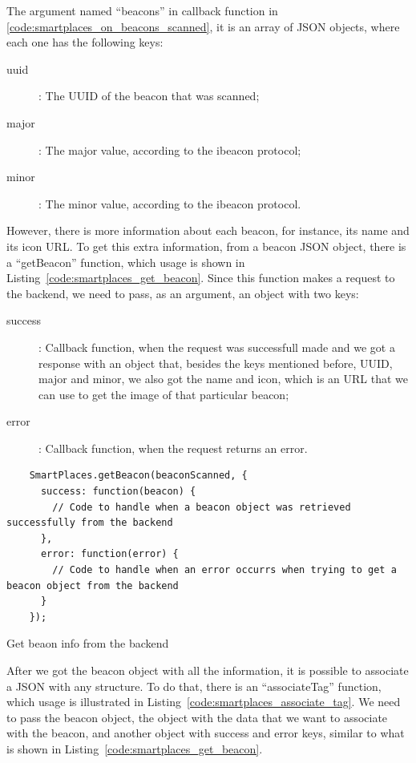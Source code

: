 The argument named ``beacons'' in callback function in \ref{code:smartplaces_on_beacons_scanned}, it is an array of \gls{JSON} objects, where each one has the following keys:
\begin{description}
  \item[uuid]: The \gls{UUID} of the beacon that was scanned;
  \item[major]: The major value, according to the ibeacon protocol;
  \item[minor]: The minor value, according to the ibeacon protocol.
\end{description}

However, there is more information about each beacon, for instance, its name and its icon \gls{URL}.
To get this extra information, from a beacon \gls{JSON} object, there is a ``getBeacon'' function, which usage is shown in Listing~\ref{code:smartplaces_get_beacon}.
Since this function makes a request to the backend, we need to pass, as an argument, an object with two keys:
\begin{description}
  \item[success]: Callback function, when the request was successfull made and we got a response with an object that, besides the keys mentioned before, \gls{UUID}, major and minor, we also got the name and icon, which is an \gls{URL} that we can use to get the image of that particular beacon;
  \item[error]: Callback function, when the request returns an error.
\end{description}

\begin{listing}[H]
  \begin{verbatim}
    SmartPlaces.getBeacon(beaconScanned, {
      success: function(beacon) {
        // Code to handle when a beacon object was retrieved successfully from the backend
      },
      error: function(error) {
        // Code to handle when an error occurrs when trying to get a beacon object from the backend
      }
    });
  \end{verbatim}
  \caption[Get beacon object]{Get beaon info from the backend}
  \label{code:smartplaces_get_beacon}
\end{listing}

After we got the beacon object with all the information, it is possible to associate a \gls{JSON} with any structure.
To do that, there is an ``associateTag'' function, which usage is illustrated in Listing~\ref{code:smartplaces_associate_tag}. We need to pass the beacon object, the object with the data that we want to associate with the beacon, and another object with success and error keys, similar to what is shown in Listing~\ref{code:smartplaces_get_beacon}.

